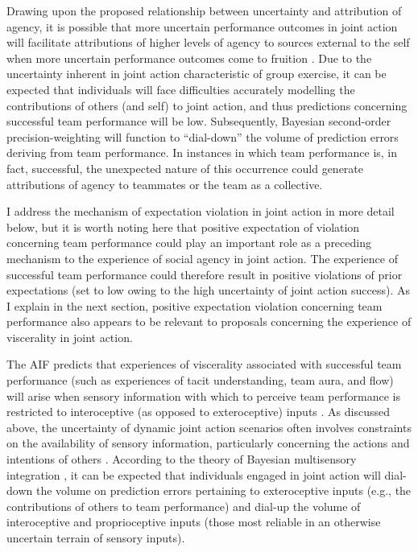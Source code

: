 \begin{CJK}{UTF8}{gbsn}
Drawing upon the proposed relationship between uncertainty and attribution of agency, it is possible that more uncertain performance outcomes in joint action will facilitate attributions of higher levels of agency to sources external to the self when more uncertain performance outcomes come to fruition \citep{Sato2005}.  Due to the uncertainty inherent in joint action characteristic of group exercise, it can be expected that individuals will face difficulties accurately modelling the contributions of others (and self) to joint action, and thus predictions concerning successful team performance will be low.
Subsequently, Bayesian second-order precision-weighting will function to ``dial-down'' the volume of prediction errors deriving from team performance.  In instances in which team performance is, in fact, successful, the unexpected nature of this occurrence could generate attributions of agency to teammates or the team as a collective.

I address the mechanism of expectation violation in joint action in more detail below, but it is worth noting here that positive expectation of violation concerning team performance could play an important role as a preceding mechanism to the experience of social agency in joint action.  The experience of successful team performance could therefore result in positive violations of prior expectations (set to low owing to the high uncertainty of joint action success).  As I explain in the next section, positive expectation violation concerning team performance also appears to be relevant to proposals concerning the experience of viscerality in joint action.


The AIF predicts that experiences of viscerality associated with successful team performance (such as experiences of tacit understanding, team aura, and flow) will arise when sensory information with which to perceive team performance is restricted to interoceptive (as opposed to exteroceptive) inputs \citep{Pezzulo2014}.  As discussed above, the uncertainty of dynamic joint action scenarios often involves constraints on the availability of sensory information, particularly concerning the actions and intentions of others \citep{Wolpert2003}.  According to the theory of Bayesian multisensory integration \citep{Ernst2004}, it can be expected that individuals engaged in joint action will dial-down the volume on prediction errors pertaining to exteroceptive inputs (e.g., the contributions of others to team performance) and dial-up the volume of interoceptive and proprioceptive inputs (those most reliable in an otherwise uncertain terrain of sensory inputs).


\end{CJK}
